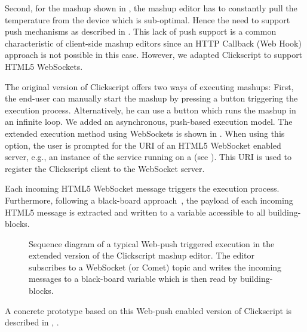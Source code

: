 Second, for the mashup shown in , the mashup editor has to constantly pull the temperature from the device which is sub-optimal. Hence the need to support push mechanisms as described in . This lack of push support is a common characteristic of client-side mashup editors since an HTTP Callback (Web Hook) approach is not possible in this case. However, we adapted Clickscript to support HTML5 WebSockets. 

The original version of Clickscript offers two ways of executing mashups: First, the end-user can manually start the mashup by pressing a  button triggering the execution process. Alternatively, he can use a  button which runs the mashup in an infinite loop. We added an asynchronous, push-based execution model. The extended execution method using WebSockets is shown in . When using this option, the user is prompted for the URI of an HTML5 WebSocket enabled server, e.g., an instance of the \tpusher{} service running on a \sg{} (see ). This URI is used to register the Clickscript client to the WebSocket server.

Each incoming HTML5 WebSocket message triggers the execution process. Furthermore, following a black-board approach~\cite{Yu2008a}, the payload of each incoming HTML5 message is extracted and written to a variable accessible to all building-blocks. 
\begin{figure}
\centering
{}
\caption{Sequence diagram of a typical Web-push triggered execution in the extended version of the Clickscript mashup editor. The editor subscribes to a WebSocket (or Comet) topic and writes the incoming messages to a black-board variable which is then read by building-blocks.}
\label{fig:seqMashup}
\end{figure}
A concrete \pMashups{} prototype based on this Web-push enabled version of Clickscript is described in , .

